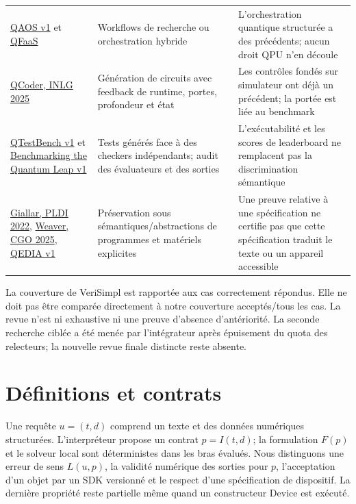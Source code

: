 \documentclass[11pt]{article}
\begin{document}
\begin{center}
\begin{tabularx}{\textwidth}{@{}XXX@{}}
\href{\detokenize{https://arxiv.org/html/2610.05304v1}}{QAOS v1} et \href{\detokenize{https://clouds.cis.unimelb.edu.au/papers/QFaaS.pdf}}{QFaaS} & Workflows de recherche ou orchestration hybride & L'orchestration quantique structurée a des précédents; aucun droit QPU n'en découle\\
\href{\detokenize{https://aclanthology.org/2025.inlg-main.43.pdf}}{QCoder, INLG 2025} & Génération de circuits avec feedback de runtime, portes, profondeur et état & Les contrôles fondés sur simulateur ont déjà un précédent; la portée est liée au benchmark\\
\href{\detokenize{https://arxiv.org/html/2610.13811v1}}{QTestBench v1} et \href{\detokenize{https://arxiv.org/html/2610.28678v1}}{Benchmarking the Quantum Leap v1} & Tests générés face à des checkers indépendants; audit des évaluateurs et des sorties & L'exécutabilité et les scores de leaderboard ne remplacent pas la discrimination sémantique\\
\href{\detokenize{https://www.cs.columbia.edu/~rgu/publications/pldi22-tao.pdf}}{Giallar, PLDI 2022}, \href{\detokenize{https://dse.in.tum.de/wp-content/uploads/2025/01/Weaver-CGO-25.pdf}}{Weaver, CGO 2025}, \href{\detokenize{https://arxiv.org/html/2610.17708v1}}{QEDIA v1} & Préservation sous sémantiques/abstractions de programmes et matériels explicites & Une preuve relative à une spécification ne certifie pas que cette spécification traduit le texte ou un appareil accessible\\
\hline
\end{tabularx}
\end{center}

La couverture de VeriSimpl est rapportée aux cas correctement répondus. Elle ne doit pas être comparée directement à notre couverture acceptés/tous les cas. La revue n'est ni exhaustive ni une preuve d'absence d'antériorité. La seconde recherche ciblée a été menée par l'intégrateur après épuisement du quota des relecteurs; la nouvelle revue finale distincte reste absente.

\section{Définitions et contrats}

Une requête $u=(t,d)$ comprend un texte et des données numériques structurées. L'interpréteur propose un contrat $p=I(t,d)$; la formulation $F(p)$ et le solveur local sont déterministes dans les bras évalués. Nous distinguons une erreur de sens $L(u,p)$, la validité numérique des sorties pour $p$, l'acceptation d'un objet par un SDK versionné et le respect d'une spécification de dispositif. La dernière propriété reste partielle même quand un constructeur Device est exécuté.
\end{document}
